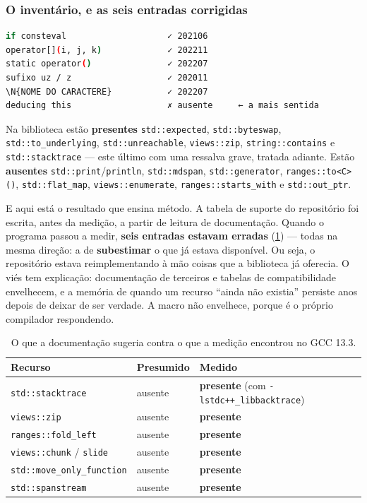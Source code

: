 \subsubsection{O inventário, e as seis entradas corrigidas}

\begin{lstlisting}[style=bt, language=bash,
    caption={Saída de \texttt{src/cpp23/}: o que este GCC 13.3 tem de
             \emph{linguagem}.}]
if consteval                    ✓ 202106
operator[](i, j, k)             ✓ 202211
static operator()               ✓ 202207
sufixo uz / z                   ✓ 202011
\N{NOME DO CARACTERE}           ✓ 202207
deducing this                   ✗ ausente     ← a mais sentida
\end{lstlisting}

Na biblioteca estão \textbf{presentes} \texttt{std::expected},
\texttt{std::byteswap}, \texttt{std::to\_underlying}, \texttt{std::unreachable},
\texttt{views::zip}, \texttt{string::contains} e \texttt{std::stacktrace} ---
este último com uma ressalva grave, tratada adiante. Estão \textbf{ausentes}
\texttt{std::print}/\texttt{println}, \texttt{std::mdspan},
\texttt{std::generator}, \texttt{ranges::to<C>()}, \texttt{std::flat\_map},
\texttt{views::enumerate}, \texttt{ranges::starts\_with} e
\texttt{std::out\_ptr}.

E aqui está o resultado que ensina método. A tabela de suporte do repositório
foi escrita, antes da medição, a partir de leitura de documentação. Quando o
programa passou a medir, \textbf{seis entradas estavam erradas}
(\cref{tab:presumido-medido}) --- todas na mesma direção: a de
\textbf{subestimar} o que já estava disponível. Ou seja, o repositório estava
reimplementando à mão coisas que a biblioteca já oferecia. O viés tem
explicação: documentação de terceiros e tabelas de compatibilidade envelhecem, e
a memória de quando um recurso ``ainda não existia'' persiste anos depois de
deixar de ser verdade. A macro não envelhece, porque é o próprio compilador
respondendo.

\begin{table}[htbp]
\centering
\caption{O que a documentação sugeria contra o que a medição encontrou no GCC 13.3.}
\label{tab:presumido-medido}
\footnotesize
\begin{tabular}{@{}lll@{}}
\toprule
\textbf{Recurso} & \textbf{Presumido} & \textbf{Medido} \\
\midrule
\texttt{std::stacktrace}               & ausente & \textbf{presente} (com \texttt{-lstdc++\_libbacktrace}) \\
\texttt{views::zip}                    & ausente & \textbf{presente} \\
\texttt{ranges::fold\_left}            & ausente & \textbf{presente} \\
\texttt{views::chunk} / \texttt{slide} & ausente & \textbf{presente} \\
\texttt{std::move\_only\_function}     & ausente & \textbf{presente} \\
\texttt{std::spanstream}               & ausente & \textbf{presente} \\
\bottomrule
\end{tabular}
\end{table}

